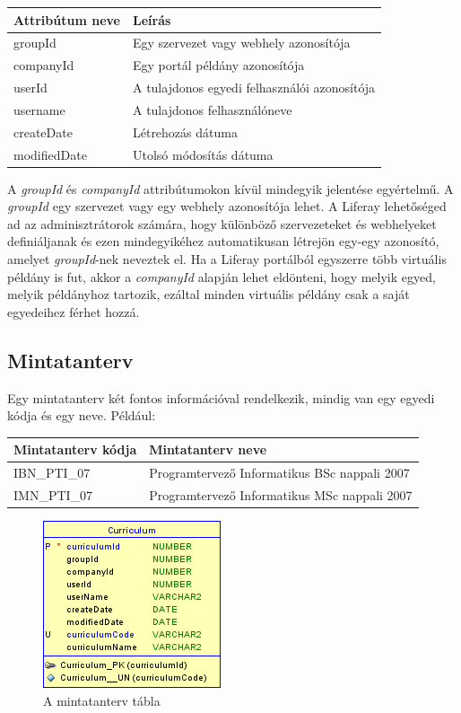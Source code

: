 \documentclass[hidelinks, 12pt, a4paper]{report}
\begin{document}
\begin{table}[H]
	\centering
	\begin{tabular}{| l | l |}
	\hline
	\textbf{Attribútum neve} & \textbf{Leírás} \\
	\hline
	groupId & Egy szervezet vagy webhely azonosítója \\
	\hline
	companyId & Egy portál példány azonosítója \\
	\hline
	userId & A tulajdonos egyedi felhasználói azonosítója \\
	\hline
	username & A tulajdonos felhasználóneve \\
	\hline
	createDate & Létrehozás dátuma \\
	\hline
	modifiedDate & Utolsó módosítás dátuma \\
	\hline
\end{tabular}
\end{table}

A \emph{groupId} és \emph{companyId} attribútumokon kívül mindegyik jelentése egyértelmű. A \emph{groupId} egy szervezet vagy egy webhely azonosítója lehet. A Liferay lehetőséged ad az adminisztrátorok számára, hogy különböző szervezeteket és webhelyeket definiáljanak és ezen mindegyikéhez automatikusan létrejön egy-egy azonosító, amelyet \emph{groupId}-nek neveztek el. Ha a Liferay portálból egyszerre több virtuális példány is fut, akkor a \emph{companyId} alapján lehet eldönteni, hogy melyik egyed, melyik példányhoz tartozik, ezáltal minden virtuális példány csak a saját egyedeihez férhet hozzá.

\subsection{Mintatanterv}

Egy mintatanterv két fontos információval rendelkezik, mindig van egy egyedi kódja és egy neve. Például:

\begin{table}[H]
	\centering
	\begin{tabular}{| l | l |}
	\hline
	\textbf{Mintatanterv kódja} & \textbf{Mintatanterv neve} \\
	\hline
	IBN\_PTI\_07 & Programtervező Informatikus BSc nappali 2007 \\
	\hline
	IMN\_PTI\_07 & Programtervező Informatikus MSc nappali 2007 \\
	\hline
\end{tabular}
\end{table}

\begin{figure}[H]
    \centering
	\includegraphics{curriculum.png}
	\caption{A mintatanterv tábla}
\end{figure}
\end{document}
